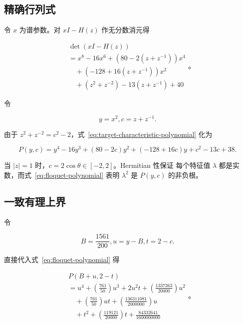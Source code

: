\subsection{精确行列式}

令 \(x\) 为谱参数。对 \(xI-H(z)\) 作无分数消元得

\begin{equation}
\label{eq:target-characteristic-polynomial}
\begin{aligned}
&\operatorname{det}(xI-H(z)) \\
&=x^{8}-16x^{6}+(80-2(z+z^{-1}))x^{4} \\
&\quad +(-128+16(z+z^{-1}))x^{2} \\
&\quad +(z^{2}+z^{-2})-13(z+z^{-1})+40
\end{aligned}
\text{。}
\end{equation}

令

\begin{equation}
y=x^{2},       c=z+z^{-1}.
\end{equation}

由于 \(z^2+z^{-2}=c^2-2\)，式~\eqref{eq:target-characteristic-polynomial} 化为

\begin{equation}
\label{eq:floquet-polynomial}
P(y,c)=y^{4}-16y^{3}+(80-2c)y^{2}+(-128+16c)y+c^{2}-13c+38.
\end{equation}

当 \(\lvert z\rvert=1\) 时，\(c=2\cos\theta\in[-2,2]\)。Hermitian 性保证
每个特征值 \(\lambda\) 都是实数，而式~\eqref{eq:floquet-polynomial} 表明
\(\lambda^2\) 是 \(P(y,c)\) 的非负根。

\subsection{一致有理上界}

令

\begin{equation}
B=\frac{1561}{200},       u=y-B,       t=2-c.
\end{equation}

直接代入式~\eqref{eq:floquet-polynomial} 得

\begin{equation}
\label{eq:rational-positive-expansion}
\begin{aligned}
&P(B+u,2-t) \\
&=u^{4}+(\frac{761}{50})u^{3}+2u^{2}t+(\frac{1337363}{20000})u^{2} \\
&\quad +(\frac{761}{50})ut+(\frac{136311081}{2000000})u \\
&\quad +t^{2}+(\frac{119121}{20000})t+\frac{84332641}{1600000000}
\end{aligned}
\text{。}
\end{equation}

